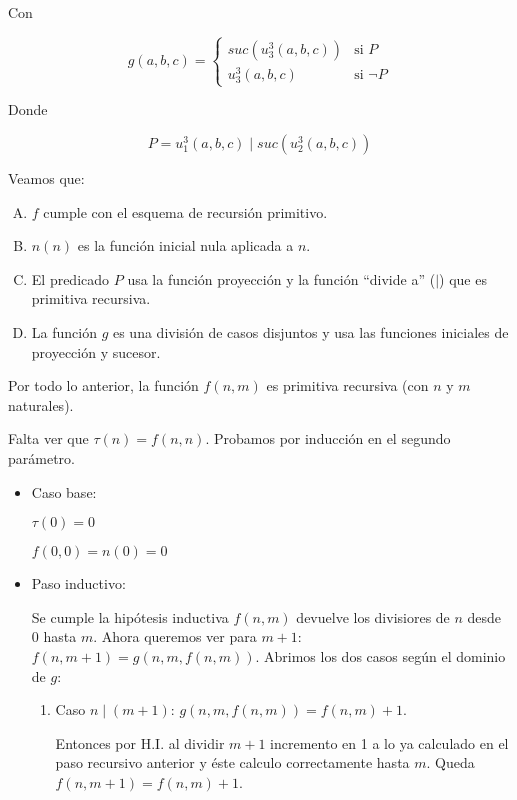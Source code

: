 \begin{questions}
\begin{solution}
Con 

\begin{equation*}
g(a,b,c) = \left\{ \begin{matrix} 
  suc(u^3_3(a,b,c)) & \text{si } P \\ 
  u^3_3(a,b,c) & \text{si } \neg P 
\end{matrix} \right.
\end{equation*}

Donde 

\begin{equation*}
 P = u^3_1(a,b,c) \mid suc(u^3_2(a,b,c))
\end{equation*}

Veamos que: 

\begin{enumerate}[A)]
 \setlength\itemsep{0em}
  \item $f$ cumple con el esquema de recursión primitivo.
  \item $n(n)$ es la función inicial nula aplicada a $n$.
  \item El predicado $P$ usa la función proyección y la función ``divide a'' ($\mid$) que es primitiva recursiva.
  \item La función $g$ es una división de casos disjuntos y usa las funciones iniciales de proyección y sucesor.
\end{enumerate}

Por todo lo anterior, la función $f(n,m)$ es primitiva recursiva (con $n$ y $m$ naturales).

Falta ver que $\tau (n) = f(n,n)$. Probamos por inducción en el segundo parámetro.

\begin{itemize}
 \item Caso base: 
 
 $\tau(0) = 0$
 
 $f(0,0) = n(0) = 0$ 
 
 \item Paso inductivo: 
 
 Se cumple la hipótesis inductiva $f(n,m)$ devuelve los divisiores de $n$ desde $0$ hasta $m$. Ahora queremos ver para $m+1$: $f(n,m+1) = g(n,m,f(n,m))$. Abrimos los dos casos seg\'un el dominio de $g$: 
 
  \begin{enumerate}[1.]
   \item Caso $n \mid (m+1)$: $g(n,m,f(n,m)) = f(n,m)+1$. 
   
    Entonces por H.I. al dividir $m+1$ incremento en 1 a lo ya calculado en el paso recursivo anterior y éste calculo correctamente hasta $m$. Queda $f(n,m+1)=f(n,m)+1$.
    

\end{enumerate}
\end{itemize}
\end{solution}
\end{questions}
